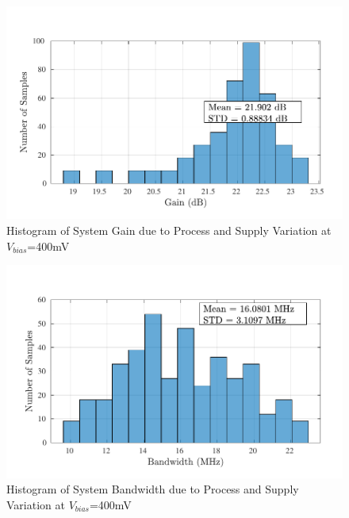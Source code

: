 \begin{figure} [H]
\centering
\includegraphics[scale=1]{Figures/Corners/Overall/PV_Mid/PDFs/PV_Mid_gain.pdf}
\caption{Histogram of System Gain due to Process and Supply Variation at $V_{bias}$=400mV}
\end{figure}

\begin{figure} [H]
\centering
\includegraphics[scale=1]{Figures/Corners/Overall/PV_Mid/PDFs/PV_Mid_bw.pdf}
\caption{Histogram of System Bandwidth due to Process and Supply Variation at $V_{bias}$=400mV}
\end{figure}

